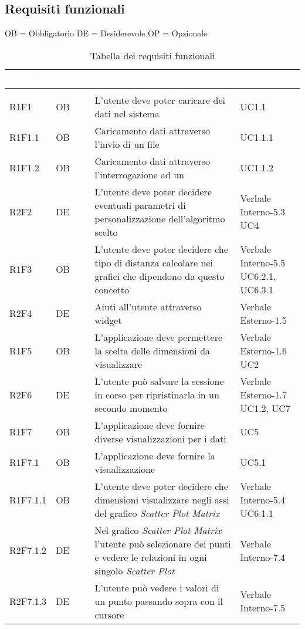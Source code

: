 \subsection{Requisiti funzionali}
OB = Obbligatorio \quad DE = Desiderevole \quad OP = Opzionale
\renewcommand{\arraystretch}{1.5}
{
\setlength\arrayrulewidth{1pt}
\begin{longtable}{C{2cm} | C{1.5cm} | C{9cm} | C{3.3cm}}
		\textcolor{white}{\textbf{Codice}} & 
		\textcolor{white}{\textbf{Classe}} & 
		\textcolor{white}{\textbf{Descrizione}} & 
		\textcolor{white}{\textbf{Fonti}} \\
		\endfirsthead
	    \\
	    \endfoot
	    \caption{Tabella dei requisiti funzionali}
	    \endlastfoot

R1F1 & OB & L'utente deve poter caricare dei dati nel sistema & UC1.1\\
R1F1.1 & OB & Caricamento dati attraverso l'invio di un file  & UC1.1.1\\
R1F1.2 & OB & Caricamento dati attraverso l'interrogazione ad un  & UC1.1.2\\

R2F2 & DE & L'utente deve poter decidere eventuali parametri di personalizzazione dell'algoritmo scelto & Verbale Interno-5.3 \newline UC4\\

R1F3 & OB & L'utente deve poter decidere che tipo di distanza calcolare nei grafici che dipendono da questo concetto & Verbale Interno-5.5 \newline UC6.2.1, UC6.3.1\\

R2F4 & DE & Aiuti all'utente attraverso widget & Verbale Esterno-1.5 \\
R1F5 & OB & L'applicazione deve permettere la scelta delle dimensioni da visualizzare & Verbale Esterno-1.6 \newline UC2\\
R2F6 & DE & L'utente può salvare la sessione in corso per ripristinarla in un secondo momento & Verbale Esterno-1.7 \newline UC1.2, UC7\\
R1F7 & OB & L'applicazione deve fornire diverse visualizzazioni per i dati & UC5\\
R1F7.1 & OB & L'applicazione deve fornire la visualizzazione  & UC5.1\\
R1F7.1.1 & OB & L'utente deve poter decidere che dimensioni visualizzare negli assi del grafico \textit{Scatter Plot Matrix} & Verbale Interno-5.4 \newline UC6.1.1\\
R2F7.1.2 & DE & Nel grafico \textit{Scatter Plot Matrix} l'utente può selezionare dei punti e vedere le relazioni in ogni singolo \textit{Scatter Plot} & Verbale Interno-7.4\\
R2F7.1.3 & DE & L'utente può vedere i valori di un punto passando sopra con il cursore & Verbale Interno-7.5\\


\end{longtable}}
